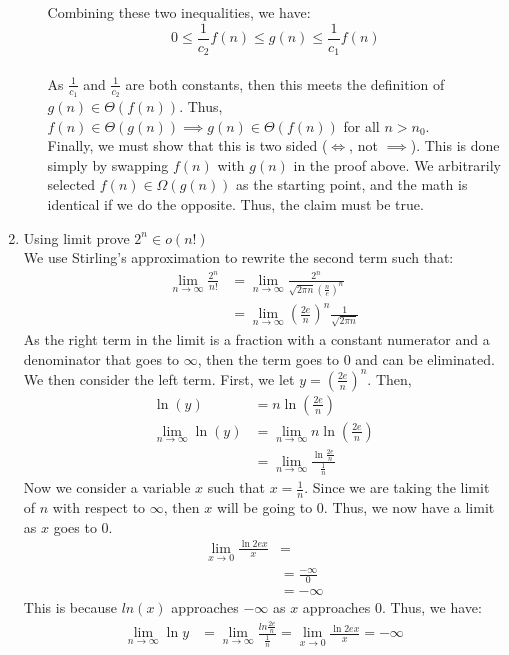 \documentclass{article}
\begin{document}
\begin{enumerate}
\begin{enumerate}
\begin{align}
			\end{align}
			\\ Combining these two inequalities, we have:
			$$0 \leq \frac{1}{c_2}f(n) \leq g(n) \leq \frac{1}{c_1}f(n)$$
			\\ As $\frac{1}{c_1}$ and $\frac{1}{c_2}$ are both constants, then this meets the definition of $g(n) \in \Theta(f(n))$. Thus, $f(n) \in \Theta(g(n)) \implies g(n) \in \Theta(f(n))$ for all $n>n_0$.
			\\ Finally, we must show that this is two sided ($\iff$, not $\implies$). This is done simply by swapping $f(n)$ with $g(n)$ in the proof above. We arbitrarily selected $f(n)\in \Omega(g(n))$ as the starting point, and the math is identical if we do the opposite. Thus, the claim must be true.
		\end{enumerate}
	\item Using limit prove $2^n \in o(n!)$
	\\ We use Stirling's approximation to rewrite the second term such that:
	\begin{align}
		\lim_{n\to\infty}\frac{2^n}{n!} &= \lim_{n\to\infty} \frac{2^n}{\sqrt{2\pi n} (\frac{n}{e})^n}\\
		&=\lim_{n\to\infty} (\frac{2e}{n})^n \frac{1}{\sqrt{2\pi n}}
	\end{align}
	As the right term in the limit is a fraction with a constant numerator and a denominator that goes to $\infty$, then the term goes to 0 and can be eliminated. We then consider the left term. First, we let $y = (\frac{2e}{n})^n$. Then,
	\begin{align}
		\ln(y) &= n \ln(\frac{2e}{n}) \\
		\lim_{n\to\infty} \ln(y) &=\lim_{n\to\infty} n \ln(\frac{2e}{n}) \\
		&= \lim_{n\to\infty} \frac{\ln \frac{2e}{n}}{\frac{1}{n}} 
	\end{align}
	Now we consider a variable $x$ such that $x=\frac{1}{n}$. Since we are taking the limit of $n$ with respect to $\infty$, then $x$ will be going to 0. Thus, we now have a limit as $x$ goes to 0.
	\begin{align}
		\lim_{x\to 0} \frac{\ln 2ex}{x} &= \\
		&= \frac{-\infty}{0} \\
		&= -\infty
	\end{align}
	This is because $ln(x)$ approaches $-\infty$ as $x$ approaches 0. Thus, we have:
	\begin{align}
		\lim_{n\to\infty} \ln y &= \lim_{n\to\infty} \frac{ln \frac{2e}{n}}{\frac{1}{n}} = \lim_{x\to 0} \frac{\ln 2ex}{x} = -\infty\\

\end{align}
\end{enumerate}
\end{document}

